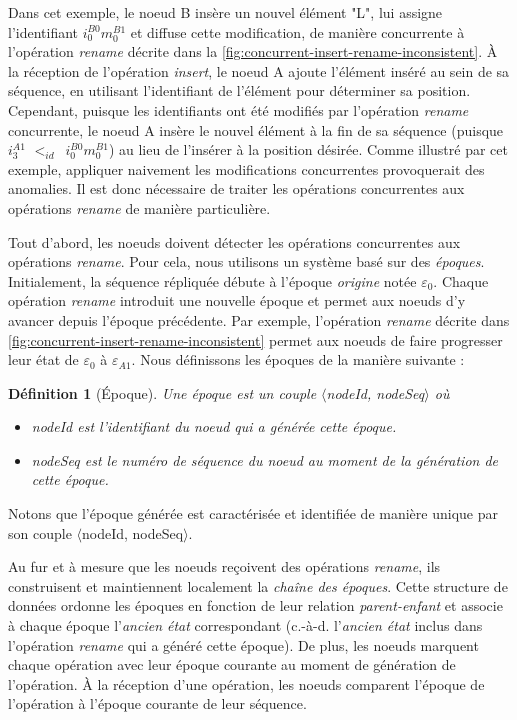 \documentclass[12pt]{thesul}
\newtheorem{definition}{Définition}
\newcommand{\ie}{c.-à-d. }
\newcommand{\trm}[1]{\mathit{#1}}
\newcommand{\id}[3]{$\trm{#1}^{\trm{#2}}_{\trm{#3}}$}
\newcommand{\epoch}[1]{$\varepsilon_{#1}$}
\newcommand{\lid}{$<_{id}$~}
\begin{document}
Dans cet exemple, le noeud B insère un nouvel élément "L", lui assigne l'identifiant \id{i}{B0}{0}\id{m}{B1}{0} et diffuse cette modification, de manière concurrente à l'opération \emph{rename} décrite dans la \autoref{fig:concurrent-insert-rename-inconsistent}.
À la réception de l'opération \emph{insert}, le noeud A ajoute l'élément inséré au sein de sa séquence, en utilisant l'identifiant de l'élément pour déterminer sa position.
Cependant, puisque les identifiants ont été modifiés par l'opération \emph{rename} concurrente, le noeud A insère le nouvel élément à la fin de sa séquence (puisque \id{i}{A1}{3} \lid \id{i}{B0}{0}\id{m}{B1}{0}) au lieu de l'insérer à la position désirée.
Comme illustré par cet exemple, appliquer naivement les modifications concurrentes provoquerait des anomalies.
Il est donc nécessaire de traiter les opérations concurrentes aux opérations \emph{rename} de manière particulière.

Tout d'abord, les noeuds doivent détecter les opérations concurrentes aux opérations \emph{rename}.
Pour cela, nous utilisons un système basé sur des \emph{époques}.
Initialement, la séquence répliquée débute à l'époque \emph{origine} notée \epoch{0}.
Chaque opération \emph{rename} introduit une nouvelle époque et permet aux noeuds d'y avancer depuis l'époque précédente.
Par exemple, l'opération \emph{rename} décrite dans \autoref{fig:concurrent-insert-rename-inconsistent} permet aux noeuds de faire progresser leur état de \epoch{0} à \epoch{A1}.
Nous définissons les époques de la manière suivante :

\begin{definition}[Époque]
  Une époque est un couple $\langle$nodeId, nodeSeq$\rangle$ où
  \begin{itemize}
    \item nodeId est l'identifiant du noeud qui a générée cette époque.
    \item nodeSeq est le numéro de séquence du noeud au moment de la génération de cette époque.
  \end{itemize}
\end{definition}

Notons que l'époque générée est caractérisée et identifiée de manière unique par son couple $\langle$nodeId, nodeSeq$\rangle$.

Au fur et à mesure que les noeuds reçoivent des opérations \emph{rename}, ils construisent et maintiennent localement la \emph{chaîne des époques}.
Cette structure de données ordonne les époques en fonction de leur relation \emph{parent-enfant} et associe à chaque époque l'\emph{ancien état} correspondant (\ie l'\emph{ancien état} inclus dans l'opération \emph{rename} qui a généré cette époque).
De plus, les noeuds marquent chaque opération avec leur époque courante au moment de génération de l'opération.
À la réception d'une opération, les noeuds comparent l'époque de l'opération à l'époque courante de leur séquence.
\end{document}
